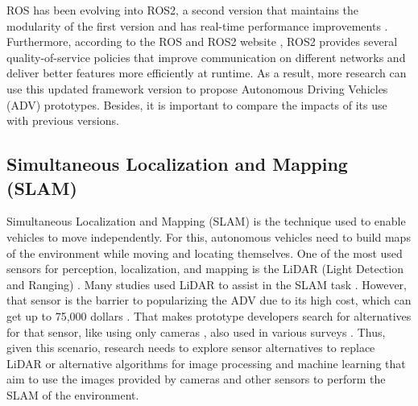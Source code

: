 \documentclass[lettersize,journal]{IEEEtran}
\begin{document}
ROS has been evolving into ROS2, a second version that maintains the modularity of the first version and has real-time performance improvements \cite{Reke2020}. Furthermore, according to the ROS and ROS2 website \cite{ros}, ROS2 provides several quality-of-service policies that improve communication on different networks and deliver better features more efficiently at runtime. As a result, more research can use this updated framework version to propose Autonomous Driving Vehicles (ADV) prototypes. Besides, it is important to compare the impacts of its use with previous versions.


\subsection{Simultaneous Localization and Mapping (SLAM)}
Simultaneous Localization and Mapping (SLAM) is the technique used to enable vehicles to move independently. For this, autonomous vehicles need to build maps of the environment while moving and locating themselves. One of the most used sensors for perception, localization, and mapping is the LiDAR (Light Detection and Ranging) \cite{Kessler2019}. Many studies used LiDAR to assist in the SLAM task \cite{Gupta2015,Kato2015,Broggi2015a,Broggi2015,Buechel2015,Belbachir2017,Zong2018,Tas2018a,Munir2018,Belcarz2018,Xu2018,buchegger2018,Kessler2019,Betz2019,Marin-Plaza2019,valera2019design,Angel2020,el2020,Karaman2017,aguilar2017,Percinski2018,fayjie2018,Wang2019,Gotlib2019,Zhou2019,Buyval2019,ILIE2020530,ORJUELA202015161,app11167225,10.1145/3556548.3559631,electronics10192447}. However, that sensor is the barrier to popularizing the ADV due to its high cost, which can get up to 75,000 dollars \cite{Lin2018}. That makes prototype developers search for alternatives for that sensor, like using only cameras \cite{Tang2018}, also used in various surveys \cite{Jo2015,Kunz2015,Kato2015,Broggi2015a,Broggi2015,Buechel2015,Bojarski2016,Belbachir2017,Zong2018,Tas2018a,Munir2018,Belcarz2018,Kessler2019,Betz2019,Marin-Plaza2019,valera2019design,Reke2020,Angel2020,pannu2015,Karaman2017,Bechtel2019,Percinski2018,fayjie2018,deac2018,jain2018,do2018,kwon2018,Sahu2019,Zhou2019,Sun2019,Wang2019,roestam2019,Sajjad2020,Febbo2020,Fathy2020,el2020,chaitra2020,pehlivan2020,Buyval2019,ILIE2020530,ORJUELA202015161,10007388,9297973,albin2021design,app11167225,10.1145/3556548.3559631,9690543,electronics10192447}. Thus, given this scenario, research needs to explore sensor alternatives to replace LiDAR or alternative algorithms for image processing and machine learning that aim to use the images provided by cameras and other sensors to perform the SLAM of the environment.
\end{document}
